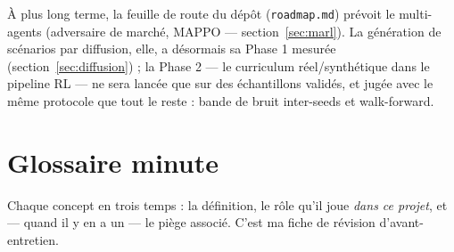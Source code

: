 \documentclass[11pt,a4paper]{article}
\newcommand{\code}[1]{\texttt{#1}}
\begin{document}
À plus long terme, la feuille de route du dépôt (\code{roadmap.md}) prévoit le
multi-agents (adversaire de marché, MAPPO --- section~\ref{sec:marl}). La génération
de scénarios par diffusion, elle, a désormais sa Phase 1 mesurée
(section~\ref{sec:diffusion}) ; la Phase 2 --- le curriculum réel/synthétique dans le
pipeline RL --- ne sera lancée que sur des échantillons validés, et jugée avec le même
protocole que tout le reste : bande de bruit inter-seeds et walk-forward.

\section{Glossaire minute}

Chaque concept en trois temps : la définition, le rôle qu'il joue \emph{dans ce
projet}, et --- quand il y en a un --- le piège associé. C'est ma fiche de révision
d'avant-entretien.
\end{document}

